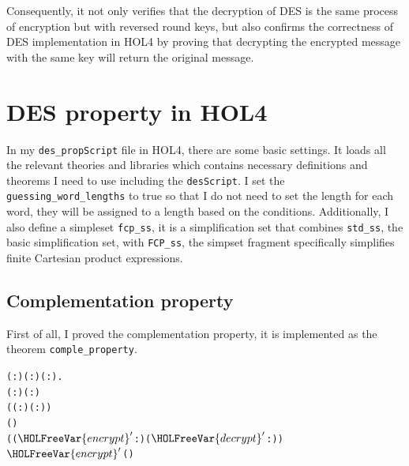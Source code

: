 \documentclass{article}
\begin{document}

Consequently, it not only verifies that the decryption of DES is the same process of encryption but with reversed round keys,
but also confirms the correctness of DES implementation in HOL4 by proving that decrypting the encrypted message with the same key
will return the original message.

\section{DES property in HOL4}
In my \verb|des_propScript| file in HOL4, there are some basic settings. It loads all the relevant theories and libraries which contains
necessary definitions and theorems I need to use including the \verb|desScript|. I set the \verb|guessing_word_lengths| to true so that
I do not need to set the length for each word, they will be assigned to a length based on the conditions. Additionally, I also define a simpleset
\verb|fcp_ss|, it is a simplification set that combines \verb|std_ss|, the basic simplification set, with \verb|FCP_ss|, the simpset fragment
specifically simplifies finite Cartesian product expressions.

\subsection{Complementation property}
First of all, I proved the complementation property, it is implemented as the theorem \verb|comple_property|.

\begin{alltt}
\HOLTokenTurnstile{} \HOLSymConst{\HOLTokenForall{}}( :) ( :) ( :).
     ( :) \HOLSymConst{\HOLTokenLt{}}  \HOLSymConst{\HOLTokenConj{}}  \HOLSymConst{\HOLTokenLt{}} ( :) \HOLSymConst{\HOLTokenConj{}}
        \HOLSymConst{=}
     (( : \HOLTokenMap{} )\HOLSymConst{,}( : \HOLTokenMap{} )) \HOLSymConst{\HOLTokenConj{}}
       (\HOLSymConst{\HOLTokenNeg{}}) \HOLSymConst{=}
     ((\ensuremath{\HOLFreeVar{encrypt}\sp{\prime{}}} : \HOLTokenMap{} )\HOLSymConst{,}(\ensuremath{\HOLFreeVar{decrypt}\sp{\prime{}}} : \HOLTokenMap{} )) \HOLSymConst{\HOLTokenImp{}}
     \HOLSymConst{\HOLTokenNeg{}}  \HOLSymConst{=} \ensuremath{\HOLFreeVar{encrypt}\sp{\prime{}}} (\HOLSymConst{\HOLTokenNeg{}})
\end{alltt}
\end{document}
